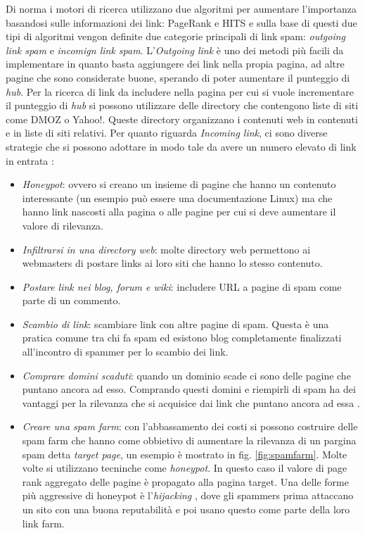 Di norma i motori di ricerca utilizzano due algoritmi per aumentare l'importanza basandosi sulle informazioni dei link: PageRank e HITS e sulla base di questi due tipi di algoritmi vengon definite due categorie principali di link spam: \textit{outgoing link spam} e \textit{incomign link spam}. L'\textit{Outgoing link} è uno dei metodi più facili da implementare in quanto basta aggiungere dei link nella propia pagina, ad altre pagine che sono considerate buone, sperando di poter aumentare il  punteggio di \textit{hub}. Per la ricerca di link da includere nella pagina per cui si vuole incrementare il punteggio di \textit{hub} si possono utilizzare delle directory che contengono liste di siti come DMOZ o Yahoo!. Queste directory organizzano i contenuti web in contenuti e in liste di siti relativi. Per quanto riguarda \textit{Incoming link}, ci sono diverse strategie che si possono adottare in modo tale da avere un numero elevato di link in entrata \cite{ilprints646}:
\begin{itemize}
\item \textit{Honeypot}: ovvero si creano un insieme di pagine che hanno un contenuto interessante (un esempio può essere una documentazione Linux) ma che hanno link nascosti alla pagina o alle pagine per cui si deve aumentare il valore di rilevanza.  
\item \textit{Infiltrarsi in una directory web}: molte directory web permettono ai webmasters di postare links ai loro siti che hanno lo stesso contenuto.
\item \textit{Postare link nei blog, forum e wiki}: includere URL a pagine di spam come parte di un commento.
\item \textit{Scambio di link}: scambiare link con altre pagine di spam. Questa è una pratica comune tra chi fa spam ed esistono blog completamente finalizzati all'incontro di spammer per lo scambio dei link.
\item \textit{Comprare domini scaduti}: quando un dominio scade ci sono delle pagine che puntano ancora ad esso. Comprando questi domini e riempirli di spam ha dei vantaggi per la rilevanza che si acquisice dai link che puntano ancora ad essa	.
\item \textit{Creare una spam farm}: con l'abbassamento dei costi si possono costruire delle spam farm che hanno come obbietivo di aumentare la rilevanza di un pargina spam detta \textit{target page}, un esempio è mostrato in fig. \ref{fig:spamfarm}. Molte volte si utilizzano tecninche come \textit{honeypot}. In questo caso il valore di page rank aggregato delle pagine è propagato alla pagina target. Una delle forme più aggressive di honeypot è l'\textit{hijacking} \cite{Spirin:2012:SWS:2207243.2207252}, dove gli spammers prima attaccano un sito con una buona reputabilità e poi usano questo come parte della loro link farm.
\end{itemize}
